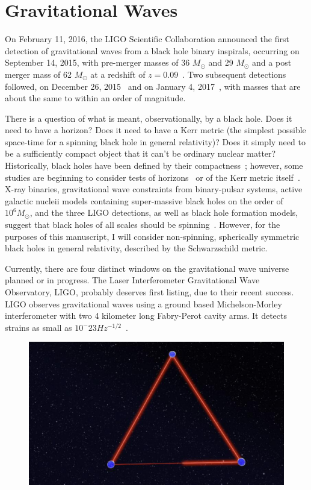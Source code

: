 \section{Gravitational Waves}

On February 11, 2016, the LIGO Scientific Collaboration announced the
first detection of gravitational waves from a black hole binary
inspirals, occurring on September 14, 2015, with pre-merger masses of
36 $M_\odot$ and 29 $M_\odot$ and a post merger mass of 62 $M_\odot$
at a redshift of $z=0.09$~\cite{GW150914}. Two subsequent detections
followed, on December 26, 2015~\cite{GW151226} and on January 4,
2017~\cite{GW170104}, with masses that are about the same to within an order of magnitude.

There is a question of what is meant, observationally, by a black hole. Does it need to have a horizon? Does it need to have a Kerr metric (the simplest possible space-time for a spinning black hole in general relativity)? Does it simply need to be a sufficiently compact object that it can't be ordinary nuclear matter? Historically, black holes have been defined by their compactness~\cite{Bambi2017}; however, some studies are beginning to consider tests of horizons~\cite{} or of the Kerr metric itself~\cite{Bambi2017}. X-ray binaries, gravitational wave constraints from binary-pulsar systems, active galactic nucleii models containing super-massive black holes on the order of $10^6 M_\odot$, and the three LIGO detections, as well as black hole formation models, suggest that black holes of all scales should be spinning~\cite{Bambi2017}. However, for the purposes of this manuscript, I will consider non-spinning, spherically symmetric black holes in general relativity, described by the Schwarzschild metric.

Currently, there are four distinct windows on the gravitational wave universe planned or in progress. The Laser Interferometer Gravitational Wave Observatory, LIGO, probably deserves first listing, due to their recent success. LIGO observes gravitational waves using a ground based Michelson-Morley interferometer with two 4 kilometer long Fabry-Perot cavity arms. It detects strains as small as $10^-{23} Hz^{-1/2}$~\cite{LIGOsensitivity}.

\begin{figure}
  \includegraphics{eLISA}
\end{figure}

